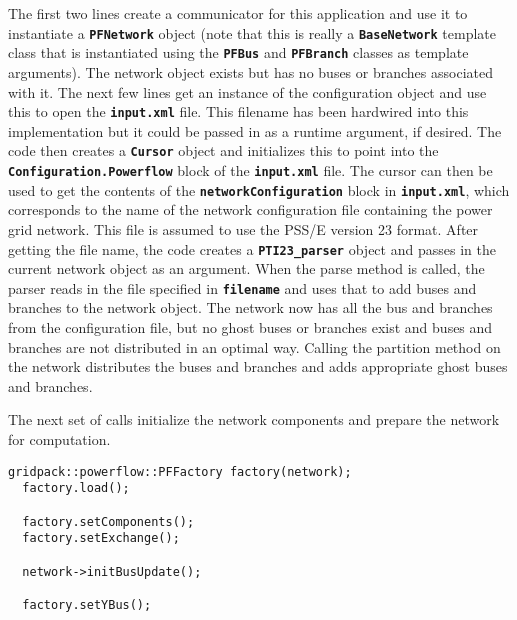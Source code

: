 The first two lines create a communicator for this application and use it to
instantiate a \texttt{\textbf{PFNetwork}} object (note that this is really a
\texttt{\textbf{BaseNetwork}} template class that is instantiated using the
\texttt{\textbf{PFBus}} and \texttt{\textbf{PFBranch}} classes as template
arguments). The network object exists but has no buses or branches associated
with it. The next few lines get an instance of the configuration object and use
this to open the \texttt{\textbf{input.xml}} file. This filename has been
hardwired into this implementation but it could be passed in as a runtime
argument, if desired. The code then creates a \texttt{\textbf{Cursor}} object
and initializes this to point into the \texttt{\textbf{Configuration.Powerflow}}
block of the \texttt{\textbf{input.xml}} file. The cursor can then be used to
get the contents of the \texttt{\textbf{networkConfiguration}} block in
\texttt{\textbf{input.xml}}, which corresponds to the name of the network
configuration file containing the power grid network. This file is assumed to
use the PSS/E version 23 format. After getting the file name, the code creates a
\texttt{\textbf{PTI23\_parser}} object and passes in the current network object
as an argument. When the parse method is called, the parser reads in the file
specified in \texttt{\textbf{filename}} and uses that to add buses and branches
to the network object. The network now has all the bus and branches from the configuration file, but no ghost buses or branches exist and buses and branches are not distributed in an optimal way. Calling the partition method on the network distributes the buses and branches and adds appropriate ghost buses and branches.

The next set of calls initialize the network components and prepare the network for computation.

{
\color{red}
\begin{Verbatim}[fontseries=b]
  gridpack::powerflow::PFFactory factory(network);
  factory.load();

  factory.setComponents();
  factory.setExchange();
  
  network->initBusUpdate();

  factory.setYBus();
\end{Verbatim}
}

